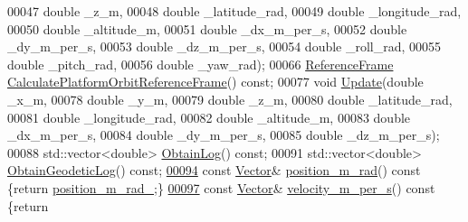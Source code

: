 \begin{DoxyCode}
00047                \textcolor{keywordtype}{double} \_z\_m,
00048                \textcolor{keywordtype}{double} \_latitude\_rad,
00049                \textcolor{keywordtype}{double} \_longitude\_rad,
00050                \textcolor{keywordtype}{double} \_altitude\_m,
00051                \textcolor{keywordtype}{double} \_dx\_m\_per\_s,
00052                \textcolor{keywordtype}{double} \_dy\_m\_per\_s,
00053                \textcolor{keywordtype}{double} \_dz\_m\_per\_s,
00054                \textcolor{keywordtype}{double} \_roll\_rad,
00055                \textcolor{keywordtype}{double} \_pitch\_rad,
00056                \textcolor{keywordtype}{double} \_yaw\_rad);
00066   \hyperlink{classosse_1_1collaborate_1_1_reference_frame}{ReferenceFrame} \hyperlink{classosse_1_1collaborate_1_1_orbital_state_a0ed1213527f9cbe7a6131feb4308046e}{CalculatePlatformOrbitReferenceFrame}() \textcolor{keyword}{
      const};
00077   \textcolor{keywordtype}{void} \hyperlink{classosse_1_1collaborate_1_1_orbital_state_a29fea23801f7de2f5ad72888b15ca220}{Update}(\textcolor{keywordtype}{double} \_x\_m,
00078               \textcolor{keywordtype}{double} \_y\_m,
00079               \textcolor{keywordtype}{double} \_z\_m,
00080               \textcolor{keywordtype}{double} \_latitude\_rad,
00081               \textcolor{keywordtype}{double} \_longitude\_rad,
00082               \textcolor{keywordtype}{double} \_altitude\_m,
00083               \textcolor{keywordtype}{double} \_dx\_m\_per\_s,
00084               \textcolor{keywordtype}{double} \_dy\_m\_per\_s,
00085               \textcolor{keywordtype}{double} \_dz\_m\_per\_s);
00088   std::vector<double> \hyperlink{classosse_1_1collaborate_1_1_orbital_state_a010c89b843916c12e8d6ec4042787af6}{ObtainLog}() \textcolor{keyword}{const};
00091   std::vector<double> \hyperlink{classosse_1_1collaborate_1_1_orbital_state_a5ef68d5b425411e26612f213ab406136}{ObtainGeodeticLog}() \textcolor{keyword}{const};
\hyperlink{classosse_1_1collaborate_1_1_orbital_state_a09eef3c4ce4d5a6aff3b6cee6e1dea0e}{00094}   \textcolor{keyword}{const} \hyperlink{classosse_1_1collaborate_1_1_vector}{Vector}& \hyperlink{classosse_1_1collaborate_1_1_orbital_state_a09eef3c4ce4d5a6aff3b6cee6e1dea0e}{position\_m\_rad}()\textcolor{keyword}{ const }\{\textcolor{keywordflow}{return} 
      \hyperlink{classosse_1_1collaborate_1_1_orbital_state_a5508edbd6215162be9483b371e95750c}{position\_m\_rad\_};\}
\hyperlink{classosse_1_1collaborate_1_1_orbital_state_a2d52b42f0259367d91e2c247aea9522f}{00097}   \textcolor{keyword}{const} \hyperlink{classosse_1_1collaborate_1_1_vector}{Vector}& \hyperlink{classosse_1_1collaborate_1_1_orbital_state_a2d52b42f0259367d91e2c247aea9522f}{velocity\_m\_per\_s}()\textcolor{keyword}{ const }\{\textcolor{keywordflow}{return} 

\end{DoxyCode}
